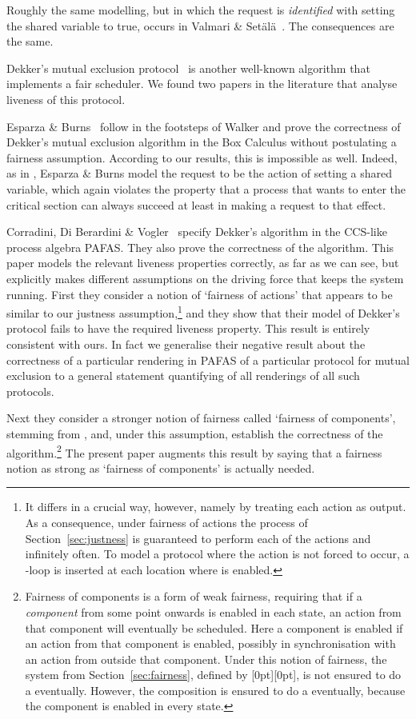 \documentclass[smallcondensed]{svjour3}
\newcommand{\plat}[1]{\raisebox{0pt}[0pt][0pt]{#1}}  \def\precond#1{{\vphantom{#1}}^\bullet #1}
\newcommand{\Sect}[1]{Section~\ref{sec:#1}}
\newcommand{\mand}{\&\xspace}
\newcounter {part}
\begin{document}
Roughly the same modelling, but in which the
request  is \emph{identified}
with setting the shared variable  to true,
occurs in Valmari \mand Set\"{a}l\"{a}~\cite{Valmari96}.
The consequences are the same.

Dekker's mutual exclusion protocol~\cite{EWD35,EWD123} is another well-known algorithm that implements a fair
scheduler. We found two papers in the literature that analyse liveness of this protocol.

Esparza \mand Burns~\cite{EsparzaBruns96}
follow in the footsteps of Walker and prove the correctness of
Dekker's mutual exclusion algorithm in the Box Calculus without
  postulating a fairness assumption. According to our results, this
is impossible as well. Indeed, as in \cite{Valmari96}, Esparza \mand Burns model the request 
to be the action of setting a shared variable, which again violates the property
that a process that wants to enter the critical section can always
succeed at least in making a request to that effect.

Corradini, Di Berardini \mand Vogler~\cite{CorradiniEtAl09}
specify Dekker's algorithm in the CCS-like process algebra PAFAS. 
They also prove the correctness 
of the algorithm. This paper models the relevant liveness properties correctly, as far
as we can see, but explicitly makes different assumptions on the driving
force that keeps the system running. First they consider a notion of
`fairness of actions' that appears to be similar to our
justness assumption,\footnote{It differs in a crucial way,
    however, namely by treating each action as output. As a
    consequence, under fairness of actions the process  of
    \Sect{justness} is guaranteed to perform each of the actions 
    and  infinitely often.  To model a protocol where the action
     is not forced to occur, a -loop is inserted 
    at each location where  is enabled.}
    and they show that their model of Dekker's protocol fails
to have the required liveness property. This result is entirely
consistent with ours. In fact we generalise their negative result
about the correctness of a particular rendering in PAFAS of a
particular protocol for mutual exclusion to a general statement
quantifying of all renderings of all such protocols.

Next they consider a stronger notion of fairness called `fairness
of components', stemming from \cite{CS87}, and, under this assumption, establish the correctness of
the algorithm.\footnote{Fairness of components is a form of weak fairness,
requiring that if a \emph{component} from some point onwards is enabled in each state, an action
from that component will eventually be scheduled.
Here a component is enabled if an action from that component is enabled, possibly in synchronisation
with an action from outside that component.\vspace{2pt} Under this notion of fairness, the system 
from \Sect{fairness}, defined by \plat{}, is not ensured to do
a  eventually. However, the composition  is ensured to do a 
eventually, because the component  is enabled in every state.}
The present paper augments this result by saying that a fairness notion as strong as `fairness
of components' is actually needed. 
\end{document}
